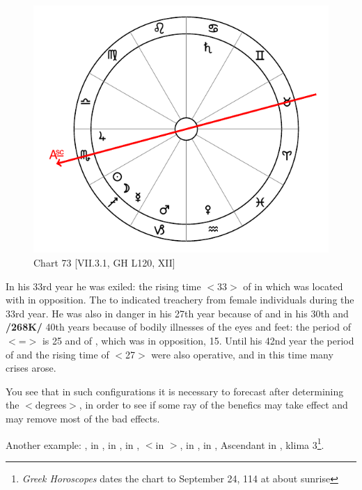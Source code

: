\begin{figure}
\centering
\vspace{-20pt}
\includegraphics[width=.68\textwidth]{charts/7_3_1}
\caption{Chart 73 [VII.3.1, GH L120, XII]}
\label{fig:chart73}
\end{figure}

In his 33rd year he was exiled: the rising time $<$33$>$ of \Cancer\xspace in which \Saturn\xspace was located with \Mars\xspace in opposition. The \Moon\xspace \Sextile\xspace to
\Venus\xspace indicated treachery from female individuals during the 33rd year. He was also in danger in his 27th year because of \Capricorn\xspace and in his 30th and \textbf{/268K/} 40th years because of bodily illnesses of the eyes and feet: the period of \Cancer $<$=\Moon$>$ is 25 and of \Mars, which was in opposition, 15. Until his 42nd year the period of \Mars\xspace and the rising time of \Capricorn\xspace $<$27$>$ were also operative, and in this time many crises arose. 

You see that in such configurations it is necessary to forecast after determining the $<$degrees$>$, in order to see if some ray of the benefics may take effect and may remove most of the bad effects.

\newpage
Another example: \Sun, \Venus\xspace in \Libra, \Saturn\xspace in \Aries, \Jupiter\xspace in \Taurus, \Mars\xspace $<$in \Libra$>$, \Mercury\xspace in \Virgo, \Moon\xspace in \Sagittarius, Ascendant in \Libra, klima 3\footnote{\textit{Greek Horoscopes} dates the chart to September 24, 114 at about sunrise}. 

